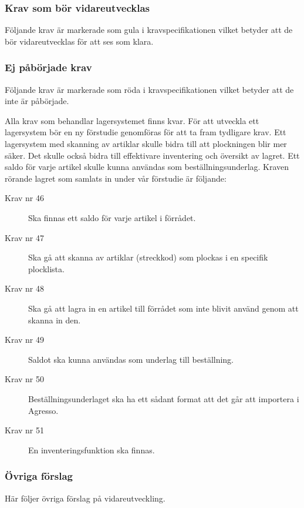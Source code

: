 \documentclass{article}
\begin{document}
\subsubsection{Krav som bör vidareutvecklas}
Följande krav är markerade som gula i kravspecifikationen vilket betyder att de bör vidareutvecklas för att ses som klara.
\subsubsection{Ej påbörjade krav}
Följande krav är markerade som röda i kravspecifikationen vilket betyder att de inte är påbörjade.

Alla krav som behandlar lagersystemet finns kvar. För att utveckla ett lagersystem bör en ny förstudie genomföras för att ta fram tydligare krav. Ett lagersystem med skanning av artiklar skulle bidra till att plockningen blir mer säker. Det skulle också bidra till effektivare inventering och översikt av lagret. Ett saldo för varje artikel skulle kunna användas som beställningsunderlag. Kraven rörande lagret som samlats in under vår förstudie är följande:
\begin{description}
\item[Krav nr 46] Ska finnas ett saldo för varje artikel i förrådet.
\item[Krav nr 47] Ska gå att skanna av artiklar (streckkod) som plockas i en specifik plocklista.
\item[Krav nr 48] Ska gå att lagra in en artikel till förrådet som inte blivit använd genom att skanna in den.
\item[Krav nr 49] Saldot ska kunna användas som underlag till beställning.
\item[Krav nr 50] Beställningsunderlaget ska ha ett sådant format att det går att importera i Agresso.
\item[Krav nr 51] En inventeringsfunktion ska finnas.
\end{description}

\subsubsection{Övriga förslag}
Här följer övriga förslag på vidareutveckling.
\end{document}
